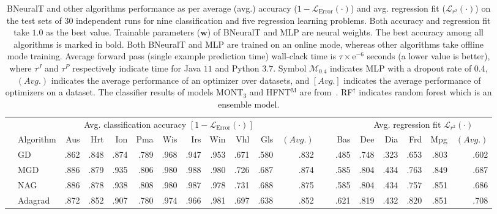 \documentclass[11pt,a4paper]{article}
\begin{document}
    \begin{table} \footnotesize
        \centering
        \renewcommand{\arraystretch}{1.1}
        \setlength{\tabcolsep}{1.5pt}
        \caption{BNeuralT and other algorithms performance as per average (avg.) accuracy ($1 - \mathcal{L}_{\text{Error}}(\cdot) $) and avg. regression fit ($\mathcal{L}_{r^2}(\cdot)$) on the test sets of 30 independent runs for nine classification and five regression learning problems. Both accuracy and regression fit take $1.0$ as the best value. Trainable parameters ($ \mathbf{w}$) of BNeuralT and MLP are neural weights. The best accuracy among all algorithms is marked in bold. Both BNeuralT and MLP are trained on an online mode, whereas other algorithms take offline mode training. Average forward pass (single example prediction time) wall-clack time is $\tau \times \text{e}^{-6}$ seconds (a lower value is better), where $\tau^J$ and $\tau^P$ respectively indicate time for Java $11$ and Python $3.7$. Symbol $\mathcal{M}_{0.4}$ indicates MLP with a dropout rate of $0.4$, $(Avg.)$ indicates the average performance of an optimizer over datasets, and $[Avg.]$ indicates the average performance of optimizers on a dataset. The classifier results of models MONT$_3$ and HFNT$^{\text{M}}$ are from~\cite{ojha2020multi}. RF$^{\dagger} $ indicates random forest which is an ensemble model.
\label{tab:BNeuralT_all_results}}\begin{tabular}[t]{llrrrrrrrrrrrrrrrrr}
            \toprule
            & & \multicolumn{9}{c}{Avg. classification accuracy $[1 - \mathcal{L}_{\text{Error}}(\cdot)]$} & & & & \multicolumn{5}{c}{Avg. regression fit $\mathcal{L}_{r^2}(\cdot)$} \\
            \cmidrule{3-12}\cmidrule{14-19}
            & Algorithm & Aus & Hrt & Ion & Pma & Wis & Irs & Win & Vhl & Gls & $(Avg.)$ & ~ & Bas & Dee & Dia & Frd & Mpg & $(Avg.)$ \\
\midrule
            \parbox[t]{3mm}{}
            & GD & .862 & .848 & .874 & .789 & .968 & .947 & .953 & .671 & .580 & .832 &  & .485 & .748 & .323 & .653 & .803 & .602 \\
            & MGD & .886 & .879 & .935 & .806 & .980 & .988 & .980 & .726 & .687 & .874 &  & .585 & .804 & .434 & .763 & .849 & .687 \\
            & NAG & .886 & .878 & .938 & .808 & .980 & .987 & .978 & .731 & .688 & .875 &  & .585 & .804 & .434 & .757 & .851 & .686 \\
            & Adagrad & .872 & .852 & .907 & .780 & .974 & .966 & .981 & .697 & .638 & .852 &  & .621 & .819 & .432 & .820 & .851 & .708 \\

\end{tabular}
\end{table}
\end{document}
